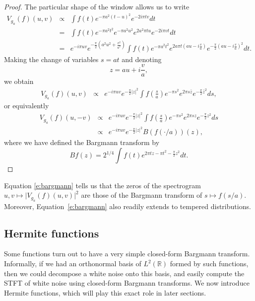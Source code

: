 \begin{proof}
The particular shape of the window allows us to write
\begin{eqnarray*}
V_{g_a}(f)(u,v) &\propto& \int f(t)e^{-\pi a^2(t-u)^2}e^{-2i\pi tv}dt\\
&=& \int f(t) e^{-\pi a^2t^2}e^{-\pi a^2u^2}e^{2a^2\pi tu}e^{-2i\pi vt}dt\\
&=& e^{-i\pi uv} e^{-\frac{\pi}{2}(a^2u^2+\frac{v^2}{a^2})}\int f(t) e^{-\pi a^2
    t^2}e^{2a\pi t(au-i\frac{v}{a})} e^{-\frac{\pi}{2}(au-i\frac{v}{a})^2}dt.
\end{eqnarray*}
Making the change of variables $s=at$ and denoting
\begin{equation}
z=au+i\frac{v}{a},
\label{e:complexTiling}
\end{equation}
 we obtain
\begin{eqnarray*}
V_{g_a}(f)(u,v) &\propto& e^{-i\pi uv}e^{-\frac{\pi}{2}\vert z\vert^2}\int
                          f\left(\frac{s}{a}\right)e^{-\pi s^2}e^{2\pi s \bar{z}}e^{-\frac{\pi}{2}\bar{z}^2}ds,
\end{eqnarray*}
or equivalently 
\begin{eqnarray}
V_{g_a}(f)(u,-v) &\propto& e^{-i\pi uv}e^{-\frac{\pi}{2}\vert z\vert^2}\int
                          f\left(\frac{s}{a}\right)e^{-\pi s^2}e^{2\pi s
                           z}e^{-\frac{\pi}{2}z^2}ds\nonumber\\
&\propto& e^{-i\pi uv}e^{-\frac{\pi}{2}\vert z\vert^2} B\left( f(\cdot/a)
          \right)(z),\label{e:bargmann}
\end{eqnarray}
where we have defined the Bargmann transform by
$$
Bf(z) = 2^{1/4}\int f(t)e^{2\pi tz-\pi t^2-\frac{\pi}{2}z^2}dt.
$$
\end{proof}
Equation \eqref{e:bargmann} tells us that the zeros of the spectrogram
$u,v\mapsto \vert V_{g_a}(f)(u,v)\vert^2$ are those of the Bargmann transform
of $s\mapsto f(s/a)$. Moreover, Equation~\eqref{e:bargmann} also readily extends
to tempered distributions.

\subsection{Hermite functions}
\label{s:hermite}
Some functions turn out to have a very simple closed-form Bargmann transform. Informally, if we had an
orthonormal basis of $L^2(\mathbb{R})$ formed by such functions, then we could
decompose a white noise onto this basis, and easily compute the STFT of white
noise using closed-form Bargmann transforms. We now introduce Hermite functions,
which will play this exact role in later sections.

